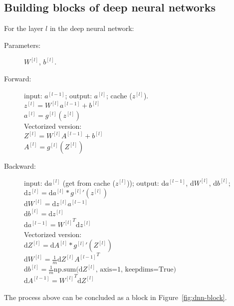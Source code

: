 \documentclass[UTF8]{article}
\newcommand{\Vector}[1]{\boldsymbol{\mathit{#1}}}   %
\newcommand{\Matrix}[1]{\boldsymbol{\mathit{#1}}}   %
\begin{document}
\subsection{Building blocks of deep neural networks}
For the layer $l$ in the deep neural network:
\begin{description}
    \item[Parameters:] $\Matrix{W}^{[l]}$, $\Vector{b}^{[l]}$.
    \item[Forward:] input: $\Vector{a}^{[l-1]}$; output: $\Vector{a}^{[l]}$;
    cache ($\Vector{z^{[l]}}$). \\
    $\Vector{z}^{[l]} = \Matrix{W}^{[l]} \Vector{a}^{[l-1]} + \Vector{b}^{[l]}$ \\
    $\Vector{a}^{[l]} = g^{[l]}(\Vector{z}^{[l]})$ \\
    Vectorized version: \\
    $\Matrix{Z}^{[l]} = \Matrix{W}^{[l]} \Matrix{A}^{[l-1]} + \Vector{b}^{[l]}$ \\
    $\Matrix{A}^{[l]} = g^{[l]}(\Matrix{Z}^{[l]})$
    \item[Backward:] input: d$\Vector{a}^{[l]}$ (get from cache ($\Vector{z^{[l]}}$));
    output: d$\Vector{a}^{[l-1]}$, d$\Matrix{W}^{[l]}$, d$\Vector{b}^{[l]}$; \\
    d$\Vector{z}^{[l]} = \text{d}\Vector{a}^{[l]} * {g^{[l]}}'(\Vector{z}^{[l]})$ \\
    d$\Matrix{W}^{[l]} = \text{d}\Vector{z}^{[l]} \Vector{a}^{[l-1]}$ \\
    d$\Vector{b}^{[l]} = \text{d}\Vector{z}^{[l]}$ \\
    d$\Vector{a}^{[l-1]} = {\Matrix{W}^{[l]}}^T \text{d}\Vector{z}^{[l]}$ \\
    Vectorized version: \\
    d$\Matrix{Z}^{[l]} = \text{d}\Matrix{A}^{[l]} * {g^{[l]}}'(\Matrix{Z}^{[l]})$ \\
    d$\Matrix{W}^{[l]} = \frac{1}{m} \text{d}\Matrix{Z}^{[l]} {\Matrix{A}^{[l-1]}}^T$ \\
    d$\Vector{b}^{[l]}
        = \frac{1}{m} \text{np.sum(d} \Matrix{Z}^{[l]} \text{, axis=1, keepdims=True)}$ \\
    d$\Matrix{A}^{[l-1]} = {\Matrix{W}^{[l]}}^T \text{d}\Matrix{Z}^{[l]}$
\end{description}

The process above can be concluded as a block in Figure~\ref{fig:dnn-block}.
\end{document}
